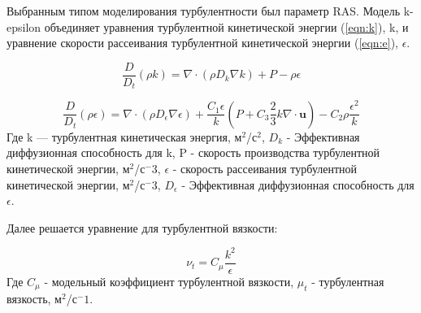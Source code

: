 \documentclass[10pt,a4paper]{book}
\begin{document}
%        
%        
%        
        
        Выбранным типом моделирования турбулентности был параметр RAS. Модель k-epsilon объединяет уравнения турбулентной кинетической энергии (\ref{eqn:k}), k, и уравнение скорости рассеивания турбулентной кинетической энергии (\ref{eqn:e}), $\epsilon$.
        
        \begin{equation}\label{eqn:k}
            \frac{D}{D_{t}}(\rho k) = \nabla \cdot (\rho D_{k}\nabla k) + P - \rho\epsilon
        \end{equation} 
        
        \begin{equation}\label{eqn:e}
            \frac{D}{D_{t}}(\rho\epsilon) = \nabla \cdot (\rho D_{\epsilon}\nabla\epsilon) + \frac{C_{1}\epsilon}{k}(P + C_{3}\frac{2}{3}k\nabla \cdot \bm{u}) - C_{2}\rho\frac{\epsilon^2}{k}
        \end{equation} 
       Где k --- турбулентная кинетическая энергия, м$^2$/с$^2$, $D_{k}$ - Эффективная диффузионная способность для k, P - скорость производства турбулентной кинетической энергии, м$^2$/с$^-3$, $\epsilon$ - скорость рассеивания турбулентной кинетической энергии, м$^2$/с$^-3$, $D_{\epsilon}$ - Эффективная диффузионная способность для $\epsilon$.
               
        Далее решается уравнение для турбулентной вязкости:
        
        \begin{equation}\label{eqn:mu}
           \nu_{t} = C_{\mu}\frac{k^2}{\epsilon}
        \end{equation} 
        Где $C_{\mu}$ - модельный коэффициент турбулентной вязкости, $\mu_{t}$ - турбулентная вязкость, м$^2$/с$^-1$.
        
\end{document}
